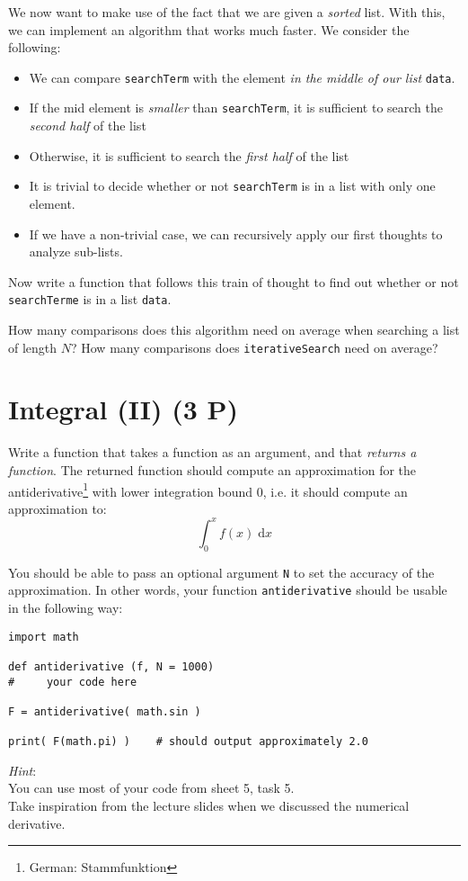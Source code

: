 \documentclass[
	ngerman,
	fontsize=10pt,
	parskip=half,
	titlepage=true,
	DIV=12
]{scrartcl}
\newcommand*{\ie}{i.\;e. }
\begin{document}
We now want to make use of the fact that we are given a \emph{sorted} list. With this, we can implement an algorithm that works much faster. We consider the following:
\begin{itemize}
\item We can compare \texttt{searchTerm} with the element \emph{in the middle of our list} \texttt{data}.
\item If the mid element is \emph{smaller} than \texttt{searchTerm}, it is sufficient to search the \emph{second half} of the list
\item Otherwise, it is sufficient to search the \emph{first half} of the list
\item It is trivial to decide whether or not \texttt{searchTerm} is in a list with only one element.
\item If we have a non-trivial case, we can recursively apply our first thoughts to analyze sub-lists.
\end{itemize}

Now write a function that follows this train of thought to find out whether or not \texttt{searchTerme} is in a list \texttt{data}.

How many comparisons does this algorithm need on average when searching a list of length $N$? How many comparisons does \texttt{iterativeSearch} need on average?


\section{Integral (II) (3 P)}
Write a function that takes a function as an argument, and that \emph{returns a function}. The returned function should compute an approximation for the antiderivative\footnote{German: Stammfunktion} with lower integration bound 0, \ie it should compute an approximation to:
\[ \int_0^x f(x) \;\text{d}{x} \]

You should be able to pass an optional argument \texttt{N} to set the accuracy of the approximation.
In other words, your function \texttt{antiderivative} should be usable in the following way:

\begin{verbatim}
import math

def antiderivative (f, N = 1000)
#     your code here

F = antiderivative( math.sin )

print( F(math.pi) )    # should output approximately 2.0
\end{verbatim}

\emph{Hint}:\\
You can use most of your code from sheet 5, task 5.\\
Take inspiration from the lecture slides when we discussed the numerical derivative.
\end{document}
